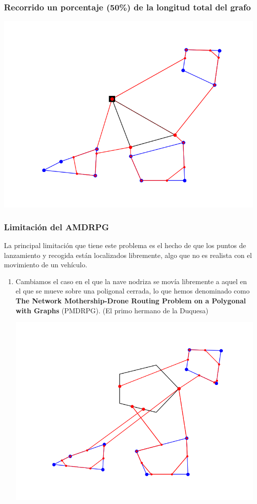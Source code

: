 \documentclass[slidestop,usepdftitle=false, xcolor=table]{beamer}
\begin{document}
	\begin{frame}
		\frametitle{Recorrido un porcentaje (50\%) de la longitud total del grafo}
		\begin{center}
			\includegraphics[width=0.8\linewidth]{PDMTZ_g}
		\end{center}
	\end{frame}

	\begin{frame}
		\frametitle{Limitación del AMDRPG}
		La principal limitación que tiene este problema es el hecho de que los puntos de lanzamiento y recogida están localizados libremente, algo que no es realista con el movimiento de un vehículo.
		\begin{small}
		\begin{enumerate}
			\item Cambiamos el caso en el que la nave nodriza se movía libremente a aquel en el que se mueve sobre una poligonal cerrada, lo que hemos denominado como \textbf{The Network Mothership-Drone Routing Problem on a Polygonal with Graphs} (PMDRPG). (El primo hermano de la Duquesa)
			\begin{center}
				\includegraphics[width=0.5\linewidth]{TDMTZ}
			\end{center}
		\end{enumerate}
	\end{small}
	\end{frame}
\end{document}
